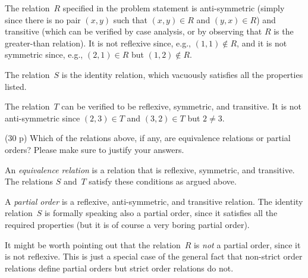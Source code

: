 \documentclass{jn-pset}
\begin{document}
\begin{problem}
\begin{solution}
    The relation~$R$ specified in the problem statement
    is anti-symmetric
    (simply since there is no pair $(x, y)$
    such that
    $(x, y) \in R$
    and
    $(y, x) \in R$)
    and transitive
    (which can be verified by case analysis, or by observing that
    $R$ is the greater-than relation).
    It is not reflexive since, e.g., 
    $(1, 1) \notin R$,
    and it is not symmetric since, e.g.,
    $(2, 1) \in R$
    but
    $(1, 2) \notin R$.

    The relation~$S$ is the identity relation,
    which vacuously satisfies all the properties listed.

    The relation~$T$ can be verified to be 
    reflexive, symmetric, and transitive.
    It is not anti-symmetric since
    $(2,3) \in T$
    and
    $(3,2) \in T$
    but
    $2 \neq 3$.    
\end{solution}

  \begin{subproblem}
    {(30 p)}
    {\ignorespaces}
    Which of the relations above, if any, are equivalence relations or
    partial orders? Please make sure to justify your answers.
  \end{subproblem}

\begin{solution}
  An \emph{equivalence relation} is a relation that is
  reflexive, symmetric, and transitive.
  The relations $S$ and~$T$ satisfy these conditions
  as argued above.

  A \emph{partial order}
  is a reflexive, anti-symmetric, and transitive relation.
  The identity relation~$S$ is formally speaking also a partial order,
  since it satisfies all the  required properties
  (but it is of course a very boring partial order). 

  It might be worth pointing out that
  the relation~$R$ is \emph{not} a partial order, since it is not reflexive.
  This is just a special case of the general fact that
  non-strict order relations define partial orders but strict order relations
  do not.
\end{solution}
\end{problem}


\end{document}

